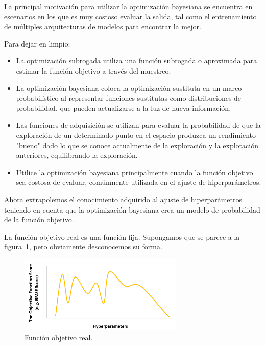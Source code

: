 \documentclass[a4paper,12pt]{article}
\begin{document}
La principal motivación para utilizar la optimización bayesiana se encuentra en escenarios en los que es muy costoso evaluar la salida, tal como el entrenamiento de múltiples arquitecturas de modelos para encontrar la mejor.

Para dejar en limpio:

\begin{itemize}
	\item La optimización subrogada utiliza una función subrogada o aproximada para estimar la función objetivo a través del muestreo.
	\item La optimización bayesiana coloca la optimización sustituta en un marco probabilístico al representar funciones sustitutas como distribuciones de probabilidad, que pueden actualizarse a la luz de nueva información.
	\item Las funciones de adquisición se utilizan para evaluar la probabilidad de que la exploración de un determinado punto en el espacio produzca un rendimiento "bueno" dado lo que se conoce actualmente de la exploración y la explotación anteriores, equilibrando la exploración.
	\item Utilice la optimización bayesiana principalmente cuando la función objetivo sea costosa de evaluar, comúnmente utilizada en el ajuste de hiperparámetros.
\end{itemize}

Ahora extrapolemos el conocimiento adquirido al ajuste de hiperparámetros teniendo en cuenta que la optimización bayesiana crea un modelo de probabilidad de la función objetivo. \citep{Wang2020Apr}

La función objetivo real es una función fija. Supongamos que se parece a la figura~\ref{fig:bayes6}, pero obviamente desconocemos su forma.

\begin{figure}[H]
	\begin{center}
	\includegraphics[width=0.7\textwidth]{bayes_opt_6.png}
  	\caption{Función objetivo real.}
  	\label{fig:bayes6}
  	\end{center}
\end{figure}
\end{document}
